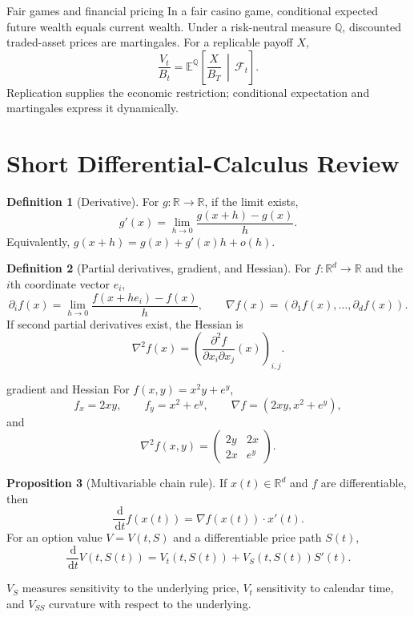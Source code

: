 \documentclass[10pt]{article}
\newcommand{\E}{\mathbb E}
\newcommand{\R}{\mathbb R}
\newcommand{\1}{\mathbf 1}
\newcommand{\cF}{\mathcal F}
\newcommand{\dd}{\,\mathrm d}
\theoremstyle{definition}
\newtheorem{definition}{Definition}[section]
\newtheorem{proposition}[definition]{Proposition}
\begin{document}
\begin{keyidea}{Fair games and financial pricing}
In a fair casino game, conditional expected future wealth equals current
wealth. Under a risk-neutral measure $\mathbb Q$, discounted traded-asset
prices are martingales. For a replicable payoff $X$,
\[
\frac{V_t}{B_t}
=\E^{\mathbb Q}\!\left[\frac{X}{B_T}\,\middle|\,\cF_t\right].
\]
Replication supplies the economic restriction; conditional expectation and
martingales express it dynamically.
\end{keyidea}

\section{Short Differential-Calculus Review}

\begin{definition}[Derivative]
For $g:\R\to\R$, if the limit exists,
\[
g'(x)=\lim_{h\to0}\frac{g(x+h)-g(x)}{h}.
\]
Equivalently, $g(x+h)=g(x)+g'(x)h+o(h)$.
\end{definition}

\begin{definition}[Partial derivatives, gradient, and Hessian]
For $f:\R^d\to\R$ and the $i$th coordinate vector $e_i$,
\[
\partial_i f(x)
=\lim_{h\to0}\frac{f(x+he_i)-f(x)}{h},
\qquad
\nabla f(x)=(\partial_1f(x),\ldots,\partial_df(x)).
\]
If second partial derivatives exist, the Hessian is
\[
\nabla^2f(x)
=\left(\frac{\partial^2f}{\partial x_i\partial x_j}(x)\right)_{i,j}.
\]
\end{definition}

\begin{boardexample}{gradient and Hessian}
For $f(x,y)=x^2y+e^y$,
\[
f_x=2xy,
\qquad f_y=x^2+e^y,
\qquad \nabla f=(2xy,x^2+e^y),
\]
and
\[
\nabla^2f(x,y)
=\begin{pmatrix}
2y&2x\\
2x&e^y
\end{pmatrix}.
\]
\end{boardexample}

\begin{proposition}[Multivariable chain rule]
If $x(t)\in\R^d$ and $f$ are differentiable, then
\[
\frac{\dd}{\dd t}f(x(t))=\nabla f(x(t))\cdot x'(t).
\]
For an option value $V=V(t,S)$ and a differentiable price path $S(t)$,
\[
\frac{\dd}{\dd t}V(t,S(t))
=V_t(t,S(t))+V_S(t,S(t))S'(t).
\]
\end{proposition}

$V_S$ measures sensitivity to the underlying price, $V_t$ sensitivity to
calendar time, and $V_{SS}$ curvature with respect to the underlying.
\end{document}
